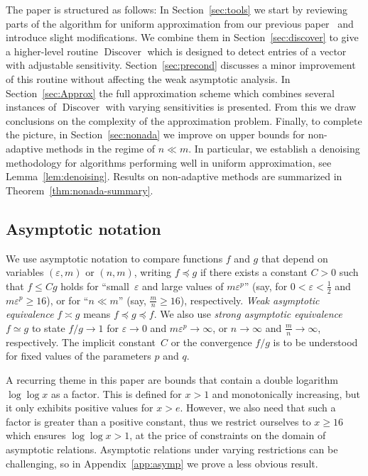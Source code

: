 \documentclass[12pt]{article}
\theoremstyle{plain}
\theoremstyle{definition}
\newcommand{\eps}{\varepsilon}
\DeclareMathOperator{\discover}{Discover} %
\begin{document}
The paper is structured as follows: In Section~\ref{sec:tools} we start by reviewing parts of the algorithm for uniform approximation from our previous paper~\cite{KW24b} and introduce slight modifications.
We combine them in Section~\ref{sec:discover} to give a higher-level routine $\discover$
which is designed to detect entries of a vector with adjustable sensitivity.
Section~\ref{sec:precond} discusses a minor improvement of this routine
without affecting the weak asymptotic analysis.
In Section~\ref{sec:Approx} the full approximation scheme which combines several instances of $\discover$ with varying sensitivities is presented.
From this we draw conclusions on the complexity of the approximation problem.
Finally, to complete the picture, in Section~\ref{sec:nonada} we improve on upper bounds for non-adaptive methods in the regime of $n \ll m$.
In particular, we establish a denoising methodology for algorithms performing well in uniform approximation,
see Lemma~\ref{lem:denoising}.
Results on non-adaptive methods are summarized in Theorem~\ref{thm:nonada-summary}.

\subsection*{Asymptotic notation}

We use asymptotic notation to compare functions $f$ and $g$ that depend on variables $(\eps,m)$ or $(n,m)$, writing \mbox{$f \preceq g$} if there exists a constant \mbox{$C > 0$} such that $f \leq C g$ holds for ``small~$\eps$ and large values of $m \eps^p$''
(say, for \mbox{$0 < \eps < \frac{1}{2}$} and~$m\eps^p \geq 16$), 
or for ``$n \ll m$'' (say, $\frac{m}{n} \geq 16$), respectively.
\emph{Weak asymptotic equivalence} $f \asymp g$ means $f \preceq g \preceq f$.
We also use \emph{strong asymptotic equivalence} $f \simeq g$ to state $f/g \to 1$ for $\eps \to 0$ and $m\eps^p \to \infty$, or $n \to \infty$ and $\frac{m}{n} \to \infty$, respectively.
The implicit constant~$C$ or the convergence $f/g$ is to be understood for fixed values of the parameters $p$ and $q$.

A recurring theme in this paper are bounds that contain a double logarithm $\log \log x$ as a factor.
This is defined for $x > 1$ and monotonically increasing, but it only exhibits positive values for $x > e$.
However, we also need that such a factor is greater than a positive constant,
thus we restrict ourselves to $x \geq 16$ which ensures $\log \log x > 1$,
at the price of constraints on the domain of asymptotic relations.
Asymptotic relations under varying restrictions can be challenging,
so in Appendix~\ref{app:asymp} we prove a
less obvious result.
\end{document}
